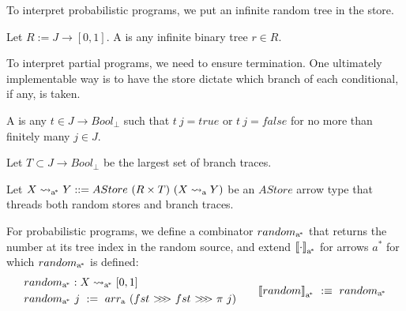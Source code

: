 \documentclass{llncs}
\newcommand{\arrow}{\rightsquigarrow}
\newcommand{\arrowarr}{\ensuremath{arr}}
\newcommand{\arrowcomp}{\ensuremath{{>}\mspace{-6mu}{>}\mspace{-6mu}{>}}}
\newcommand{\gen}{_\mathrm{a}}
\newcommand{\genc}{_\mathrm{a^{\mspace{-2mu}*}}}
\begin{document}
To interpret probabilistic programs, we put an infinite random tree in the store.

\begin{definition}
Let $R := J \to [0,1]$.
A  is any infinite binary tree $r \in R$.
\end{definition}

To interpret partial programs, we need to ensure termination.
One ultimately implementable way is to have the store dictate which branch of each conditional, if any, is taken.

\begin{definition}
A  is any $t \in J \to Bool_\bot$ such that $t~j = true$ or $t~j = false$ for no more than finitely many $j \in J$.

Let $T \subset J \to Bool_\bot$ be the largest set of branch traces.
\end{definition}

Let $X \arrow\genc Y ::= AStore~(R \times T)~(X \arrow\gen Y)$ be an $AStore$ arrow type that threads both random stores and branch traces.

For probabilistic programs, we define a combinator $random\genc$ that returns the number at its tree index in the random source, and extend $\meaningof{\cdot}\genc$ for arrows $a^*$ for which $random\genc$ is defined:
\begin{equation}
\begin{aligned}
	&\begin{aligned}
		&random\genc : X \arrow\genc [0,1] \\
		&random\genc~j \ := \ \arrowarr\gen~(fst~\arrowcomp~fst~\arrowcomp~\pi~j)
	\end{aligned}
&\tab
	\meaningof{random}\genc \ :\equiv \ random\genc
\end{aligned}
\end{equation}
\end{document}
